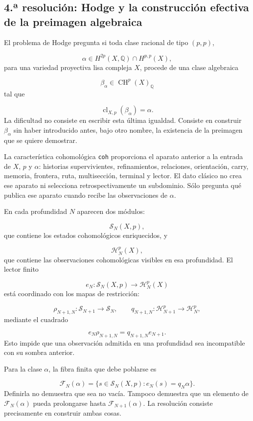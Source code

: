 \subsection{4.ª resolución: Hodge y la construcción efectiva de la preimagen algebraica}
El problema de Hodge pregunta si toda clase racional de tipo \((p,p)\),\par
\[
\alpha\in
H^{2p}(X,\mathbb Q)\cap H^{p,p}(X),
\]
para una variedad proyectiva lisa compleja \(X\), procede de una clase algebraica\par
\[
\beta_\alpha\in \operatorname{CH}^{p}(X)_{\mathbb Q}
\]
tal que\par
\[
\operatorname{cl}_{X,p}(\beta_\alpha)=\alpha.
\]
La dificultad no consiste en escribir esta última igualdad. Consiste en construir \(\beta_\alpha\) sin haber introducido antes, bajo otro nombre, la existencia de la preimagen que se quiere demostrar.\par
La característica cohomológica \texttt{coh} proporciona el aparato anterior a la entrada de \(X\), \(p\) y \(\alpha\): historias supervivientes, refinamientos, relaciones, orientación, carry, memoria, frontera, ruta, multisección, terminal y lector. El dato clásico no crea ese aparato ni selecciona retrospectivamente un subdominio. Sólo pregunta qué publica ese aparato cuando recibe las observaciones de \(\alpha\).\par
En cada profundidad \(N\) aparecen dos módulos:\par
\[
\mathscr S_N(X,p),
\]
que contiene los estados cohomológicos enriquecidos, y\par
\[
\mathscr H_N^p(X),
\]
que contiene las observaciones cohomológicas visibles en esa profundidad. El lector finito\par
\[
e_N:\mathscr S_N(X,p)\longrightarrow\mathscr H_N^p(X)
\]
está coordinado con los mapas de restricción:\par
\[
\rho_{N+1,N}:\mathscr S_{N+1}\longrightarrow\mathscr S_N,
\qquad
q_{N+1,N}:\mathscr H_{N+1}^p\longrightarrow\mathscr H_N^p,
\]
mediante el cuadrado\par
\[
e_N\rho_{N+1,N}
=
q_{N+1,N}e_{N+1}.
\]
Esto impide que una observación admitida en una profundidad sea incompatible con su sombra anterior.\par
Para la clase \(\alpha\), la fibra finita que debe poblarse es\par
\[
\mathscr F_N(\alpha)
=
\{s\in\mathscr S_N(X,p):e_N(s)=q_N\alpha\}.
\]
Definirla no demuestra que sea no vacía. Tampoco demuestra que un elemento de \(\mathscr F_N(\alpha)\) pueda prolongarse hasta \(\mathscr F_{N+1}(\alpha)\). La resolución consiste precisamente en construir ambas cosas.\par
{}
